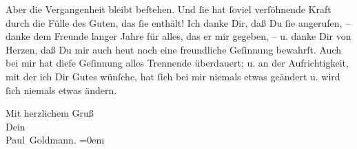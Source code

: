 \pstart
           Aber die Vergangenheit {\pb}bleibt beſtehen. Und ſie
               hat ſoviel verſöhnende Kraft durch die Fülle des Guten, das ſie enthält! Ich danke
               Dir, daß Du ſie angerufen, – danke dem Freunde langer Jahre für alles, das er mir
               gegeben, – u. danke Dir von Herzen, daß Du mir auch heut noch eine freundliche
               Geſinnung bewahrſt. Auch bei mir hat dieſe Geſinnung alles Trennende überdauert; {\pb}u. an der Aufrichtigkeit, mit der ich Dir Gutes
               wünſche, hat ſich bei mir niemals etwas geändert u. wird ſich niemals etwas
               ändern.\pend
           
\pstart
           Mit herzlichem Gruß {\\[\baselineskip]}Dein {\\[\baselineskip]}\spacefill\mbox{Paul Goldmann.}\pend
           \leftskip=0em{}\endnumbering{}  
      